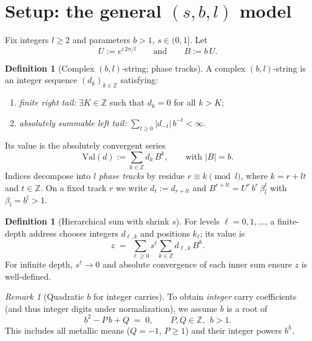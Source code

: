 \documentclass[11pt]{article}
\theoremstyle{definition}
\newtheorem{definition}[theorem]{Definition}
\theoremstyle{remark}
\newtheorem{remark}[theorem]{Remark}
\newcommand{\Val}{\mathrm{Val}}
\newcommand{\Z}{\mathbb{Z}}
\begin{document}
\section{Setup: the general $(s,b,l)$ model}\label{sec:setup}
Fix integers $l\ge2$ and parameters $b>1$, $s\in(0,1]$. Let
\[
U:=e^{i\,2\pi/l}\qquad\text{and}\qquad B:=b\,U.
\]

\begin{definition}[Complex $(b,l)$-string; phase tracks]\label{def:string}
A complex $(b,l)$-string is an integer sequence $(d_k)_{k\in\Z}$ satisfying:
\begin{enumerate}
\item \emph{finite right tail:} $\exists K\in\Z$ such that $d_k=0$ for all $k>K$;\vspace{2pt}
\item \emph{absolutely summable left tail:} $\sum_{t\ge0} |d_{-t}|\,b^{-t}<\infty$.
\end{enumerate}
Its value is the absolutely convergent series
\[
\Val(d):=\sum_{k\in\Z} d_k\,B^k,\qquad\text{with }|B|=b.
\]
Indices decompose into $l$ \emph{phase tracks} by residue $r\equiv k\pmod l$, where $k=r+lt$ and $t\in\Z$. On a fixed track $r$ we write $d_t:=d_{r+lt}$ and
\(
B^{r+lt}=U^r\,b^{r}\,\beta_l^t
\)
with $\beta_l=b^l>1$.
\end{definition}

\begin{definition}[Hierarchical sum with shrink $s$]\label{def:hier}
For levels $\ell=0,1,\dots$, a finite-depth address chooses integers $d_{\ell,k}$ and positions $k_\ell$; its value is
\[
z \;=\; \sum_{\ell\ge0} s^{\ell}\!\sum_{k\in\Z} d_{\ell,k}\,B^{k}.
\]
For infinite depth, $s^\ell\to0$ and absolute convergence of each inner sum ensure $z$ is well-defined.
\end{definition}

\begin{remark}[Quadratic $b$ for integer carries]\label{rem:quad}
To obtain \emph{integer} carry coefficients (and thus integer digits under normalization), we assume $b$ is a root of
\begin{equation}\label{eq:quad}
b^2 - P\,b + Q \;=\; 0,\qquad P,Q\in\Z,\ \ b>1.
\end{equation}
This includes all metallic means ($Q=-1$, $P\ge1$) and their integer powers $b^h$.
\end{remark}
\end{document}
